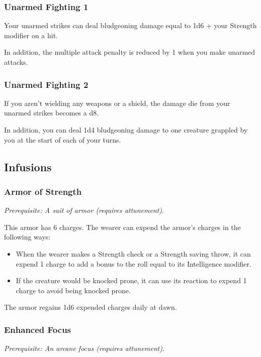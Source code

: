     \subsubsection{Unarmed Fighting 1}
        Your unarmed strikes can deal bludgeoning damage equal to 1d6 + your Strength modifier on a hit.

        In addition, the multiple attack penalty is reduced by 1 when you make unarmed attacks.
    \subsubsection{Unarmed Fighting 2}
        If you aren't wielding any weapons or a shield, the damage die from your unarmed strikes becomes a d8.

        In addition, you can deal 1d4 bludgeoning damage to one creature grappled by you at the start of each of your turns.


\subsection*{Infusions} \label{ssec::infusions}
    \subsubsection{Armor of Strength}
        \textit{Prerequisite: A suit of armor (requires attunement)}.

        This armor has 6 charges. The wearer can expend the armor's charges in the following ways:
        \begin{itemize}
            \item When the wearer makes a Strength check or a Strength saving throw, it can expend 1 charge to add a bonus to the roll equal to its Intelligence modifier.
            \item If the creature would be knocked prone, it can use its reaction to expend 1 charge to avoid being knocked prone.
        \end{itemize}
        The armor regains 1d6 expended charges daily at dawn.
    \subsubsection{Enhanced Focus}
        \textit{Prerequisite: An arcane focus (requires attunement)}.

